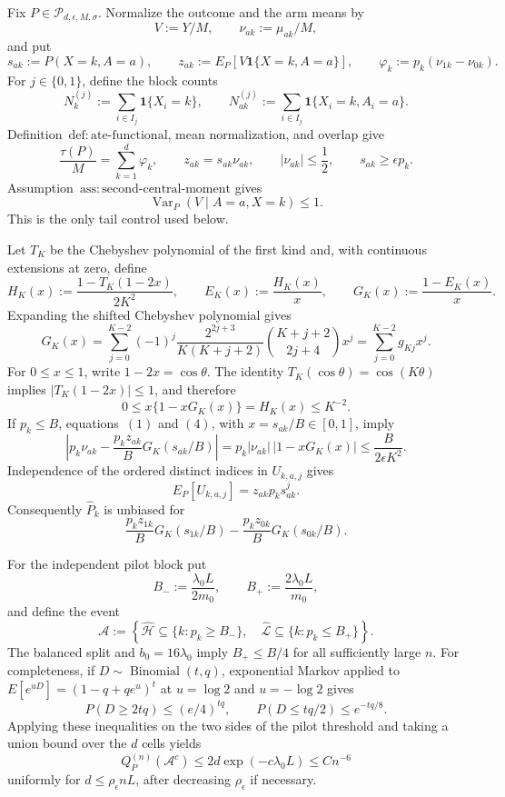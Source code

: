 Fix \(P\in\mathcal P_{d,\epsilon,M,\sigma}\).  Normalize the outcome and the arm means by
\[
 V:=Y/M,\qquad \nu_{ak}:=\mu_{ak}/M,
\]
and put
\[
 s_{ak}:=P(X=k,A=a),\qquad
 z_{ak}:=E_P[V\mathbf 1\{X=k,A=a\}],\qquad
 \varphi_k:=p_k(\nu_{1k}-\nu_{0k}).
\]
For \(j\in\{0,1\}\), define the block counts
\[
 N_k^{(j)}:=\sum_{i\in I_j}\mathbf 1\{X_i=k\},
 \qquad
 N_{ak}^{(j)}:=\sum_{i\in I_j}\mathbf 1\{X_i=k,A_i=a\}.
\]
Definition~\(\mathrm{def:ate\text{-}functional}\), mean normalization, and overlap give
\[
 \frac{\tau(P)}M=\sum_{k=1}^d\varphi_k,\qquad
 z_{ak}=s_{ak}\nu_{ak},\qquad
 |\nu_{ak}|\le\frac12,\qquad
 s_{ak}\ge\epsilon p_k.
\tag{1}
\]
Assumption~\(\mathrm{ass:second\text{-}central\text{-}moment}\) gives
\[
 \operatorname{Var}_P(V\mid A=a,X=k)\le1.
\tag{2}
\]
This is the only tail control used below.

Let \(T_K\) be the Chebyshev polynomial of the first kind and, with continuous extensions at zero, define
\[
 H_K(x):=\frac{1-T_K(1-2x)}{2K^2},\qquad
 E_K(x):=\frac{H_K(x)}x,\qquad
 G_K(x):=\frac{1-E_K(x)}x.
\]
Expanding the shifted Chebyshev polynomial gives
\[
 G_K(x)=\sum_{j=0}^{K-2}(-1)^j
 \frac{2^{2j+3}}{K(K+j+2)}\binom{K+j+2}{2j+4}x^j
 =\sum_{j=0}^{K-2}g_{Kj}x^j.
\tag{3}
\]
For \(0\le x\le1\), write \(1-2x=\cos\theta\).  The identity \(T_K(\cos\theta)=\cos(K\theta)\) implies \(|T_K(1-2x)|\le1\), and therefore
\[
 0\le x\{1-xG_K(x)\}=H_K(x)\le K^{-2}.
\tag{4}
\]
If \(p_k\le B\), equations~\((1)\) and \((4)\), with \(x=s_{ak}/B\in[0,1]\), imply
\[
 \left|p_k\nu_{ak}-\frac{p_kz_{ak}}B G_K(s_{ak}/B)\right|
 =p_k|\nu_{ak}|\,|1-xG_K(x)|
 \le\frac{B}{2\epsilon K^2}.
\tag{5}
\]
Independence of the ordered distinct indices in \(U_{k,a,j}\) gives
\[
 E_P[U_{k,a,j}]=z_{ak}p_ks_{ak}^{j}.
\]
Consequently \(\widehat P_k\) is unbiased for
\[
 \frac{p_kz_{1k}}B G_K(s_{1k}/B)-
 \frac{p_kz_{0k}}B G_K(s_{0k}/B).
\tag{6}
\]

For the independent pilot block put
\[
 B_-:=\frac{\lambda_0L}{2m_0},\qquad
 B_+:=\frac{2\lambda_0L}{m_0},
\]
and define the event
\[
 \mathcal A:=\left\{
 \widehat{\mathcal H}\subseteq\{k:p_k\ge B_-\},\quad
 \widehat{\mathcal L}\subseteq\{k:p_k\le B_+\}
 \right\}.
\]
The balanced split and \(b_0=16\lambda_0\) imply \(B_+\le B/4\) for all sufficiently large \(n\).  For completeness, if \(D\sim\operatorname{Binomial}(t,q)\), exponential Markov applied to \(E[e^{uD}]=(1-q+qe^u)^t\) at \(u=\log2\) and \(u=-\log2\) gives
\[
 P(D\ge2tq)\le(e/4)^{tq},
 \qquad
 P(D\le tq/2)\le e^{-tq/8}.
\]
Applying these inequalities on the two sides of the pilot threshold and taking a union bound over the \(d\) cells yields
\[
 Q_P^{(n)}(\mathcal A^c)
 \le2d\exp(-c\lambda_0L)
 \le Cn^{-6}
\tag{7}
\]
uniformly for \(d\le\rho_{\epsilon}nL\), after decreasing \(\rho_{\epsilon}\) if necessary.

